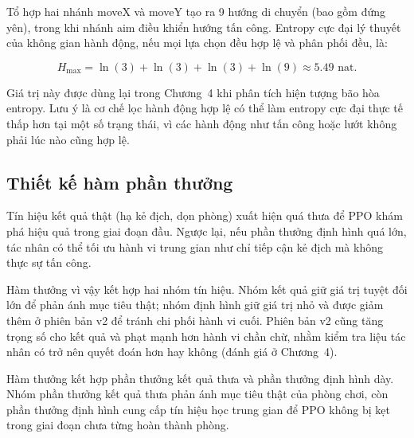 Tổ hợp hai nhánh moveX và moveY tạo ra 9 hướng di chuyển (bao gồm đứng yên), trong khi nhánh aim điều khiển hướng tấn công. Entropy cực đại lý thuyết của không gian hành động, nếu mọi lựa chọn đều hợp lệ và phân phối đều, là:

\begin{equation}
    H_{\max} = \ln(3) + \ln(3) + \ln(3) + \ln(9) \approx 5.49 \text{ nat}.
    \label{eq:max_entropy}
\end{equation}

Giá trị này được dùng lại trong Chương~4 khi phân tích hiện tượng bão hòa entropy. Lưu ý là cơ chế lọc hành động hợp lệ có thể làm entropy cực đại thực tế thấp hơn tại một số trạng thái, vì các hành động như tấn công hoặc lướt không phải lúc nào cũng hợp lệ.

\subsection{Thiết kế hàm phần thưởng}

Tín hiệu kết quả thật (hạ kẻ địch, dọn phòng) xuất hiện quá thưa để PPO khám phá hiệu quả trong giai đoạn đầu. Ngược lại, nếu phần thưởng định hình quá lớn, tác nhân có thể tối ưu hành vi trung gian như chỉ tiếp cận kẻ địch mà không thực sự tấn công.

Hàm thưởng vì vậy kết hợp hai nhóm tín hiệu. Nhóm kết quả giữ giá trị tuyệt đối lớn để phản ánh mục tiêu thật; nhóm định hình giữ giá trị nhỏ và được giảm thêm ở phiên bản v2 để tránh chi phối hành vi cuối. Phiên bản v2 cũng tăng trọng số cho kết quả và phạt mạnh hơn hành vi chần chừ, nhằm kiểm tra liệu tác nhân có trở nên quyết đoán hơn hay không (đánh giá ở Chương~4).

Hàm thưởng kết hợp phần thưởng kết quả thưa và phần thưởng định hình dày. Nhóm phần thưởng kết quả thưa phản ánh mục tiêu thật của phòng chơi, còn phần thưởng định hình cung cấp tín hiệu học trung gian để PPO không bị kẹt trong giai đoạn chưa từng hoàn thành phòng.

